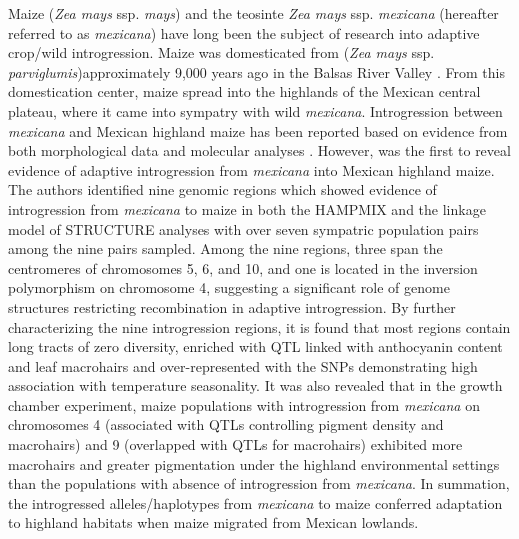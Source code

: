 \documentclass[11pt]{article}
\begin{document}
\begin{enumerate}
\begin{enumerate}
Maize (\emph{Zea mays} ssp. \emph{mays}) and the teosinte \emph{Zea mays} ssp. \emph{mexicana} (hereafter referred to as \emph{mexicana}) have long been the subject of research into adaptive crop/wild introgression.
Maize was domesticated from (\emph{Zea mays} ssp. \emph{parviglumis})approximately 9,000 years ago in the Balsas River Valley \cite{matsuoka2002single}.
From this domestication center, maize spread into the highlands of the Mexican central plateau, where it came into sympatry with wild \emph{mexicana}.
Introgression between \emph{mexicana} and Mexican highland maize has been reported based on evidence from both morphological data \cite {wilkes1977, lauter2004, doebley1984} and molecular analyses \cite{matsuoka2002, vanHeerwaarden2011, doebley1987, warburton2011, fukunaga2005}.
However, \citep{hufford2013} was the first to reveal evidence of adaptive introgression from \emph{mexicana} into Mexican highland maize.
The authors identified nine genomic regions which showed evidence of introgression from \emph{mexicana} to maize in both the HAMPMIX and the linkage model of STRUCTURE analyses with over seven sympatric population pairs among the nine pairs sampled.
Among the nine regions, three span the centromeres of chromosomes 5, 6, and 10, and one is located in the inversion polymorphism on chromosome 4, suggesting a significant role of genome structures restricting recombination in adaptive introgression.
By further characterizing the nine introgression regions, it is found that most regions contain long tracts of zero diversity, enriched with QTL linked with anthocyanin content and leaf macrohairs \cite{lauter2004} and over-represented with the SNPs demonstrating high association with temperature seasonality.
It was also revealed that in the growth chamber experiment, maize populations with introgression from \emph{mexicana} on chromosomes 4 (associated with QTLs controlling pigment density and macrohairs) and 9 (overlapped with QTLs for macrohairs) exhibited more macrohairs and greater pigmentation under the highland environmental settings than the populations with absence of introgression from \emph{mexicana}.
In summation, the introgressed alleles/haplotypes from \emph{mexicana} to maize conferred adaptation to highland habitats when maize migrated from Mexican lowlands.


\end{enumerate}
\end{enumerate}
\end{document}
